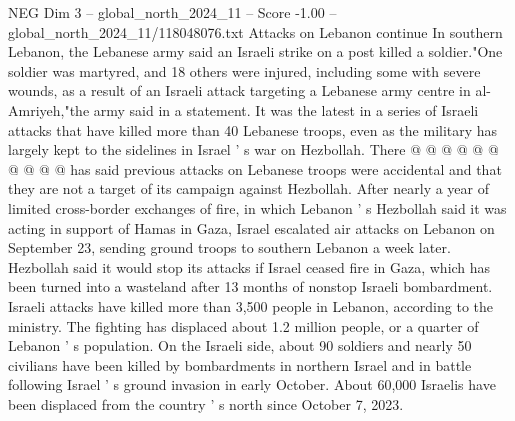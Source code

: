 \begin{textsample}{NEG Dim 3 – global\_north\_2024\_11 – Score -1.00 – global\_north\_2024\_11/118048076.txt}
Attacks on Lebanon continue In southern Lebanon, the Lebanese army said an Israeli strike on a post killed a soldier."One soldier was martyred, and 18 others were injured, including some with severe wounds, as a result of an Israeli attack targeting a Lebanese army centre in al-Amriyeh,"the army said in a statement.
It was the latest in a series of Israeli attacks that have killed more than 40 Lebanese troops, even as the military has largely kept to the sidelines in Israel ' s war on Hezbollah.
There @ @ @ @ @ @ @ @ @ @ has said previous attacks on Lebanese troops were accidental and that they are not a target of its campaign against Hezbollah.
After nearly a year of limited cross-border exchanges of fire, in which Lebanon ' s Hezbollah said it was acting in support of Hamas in Gaza, Israel escalated air attacks on Lebanon on September 23, sending ground troops to southern Lebanon a week later.
Hezbollah said it would stop its attacks if Israel ceased fire in Gaza, which has been turned into a wasteland after 13 months of nonstop Israeli bombardment.
Israeli attacks have killed more than 3,500 people in Lebanon, according to the ministry.
The fighting has displaced about 1.2 million people, or a quarter of Lebanon ' s population.
On the Israeli side, about 90 soldiers and nearly 50 civilians have been killed by bombardments in northern Israel and in battle following Israel ' s ground invasion in early October.
About 60,000 Israelis have been displaced from the country ' s north since October 7, 2023.

\end{textsample}
